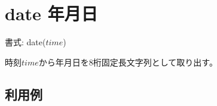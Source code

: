 
%

\section{date 年月日\label{sect:date}}

書式: date($time$)

時刻$time$から年月日を8桁固定長文字列として取り出す。

\subsection*{利用例}


%

